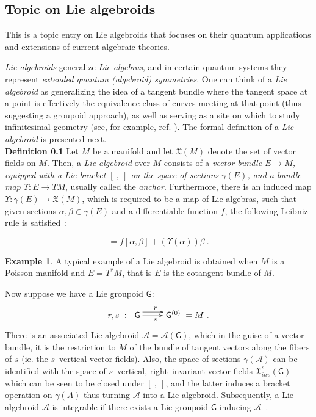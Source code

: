 \documentclass[12pt]{article}
\theoremstyle{plain}
\theoremstyle{definition}
\newtheorem{example}{Example}[section]
\numberwithin{equation}{section}
\newcommand{\A}{\mathcal A}
\renewcommand{\a}{\alpha}
\newcommand{\lra}{{\longrightarrow}}
\newcommand{\<}{{\langle}}
\begin{document}
\subsection{Topic on Lie algebroids}
 This is a topic entry on Lie algebroids that focuses on their quantum applications and extensions of current algebraic theories. 

\emph{Lie algebroids} generalize \emph{Lie algebras}, and in certain quantum systems they represent \emph{extended quantum (algebroid) symmetries}. One can think of a \emph{Lie algebroid} as generalizing the idea of a tangent bundle where the tangent space at a point is effectively the equivalence class of curves meeting at that point (thus
suggesting a groupoid approach), as well as serving as a site on which to study infinitesimal geometry (see, for example, ref. \cite{Mackenzie2005}). The formal definition of a \emph{Lie algebroid} is presented next. \\

\textbf{Definition 0.1}
Let $M$ be a manifold and let $\mathfrak X(M)$ denote the set of vector fields on $M$. Then, a 
\emph{Lie algebroid} over $M$ consists of a \emph{vector bundle $E \lra M$,
equipped with a Lie bracket $[~,~]$ on the space of sections $\gamma(E)$, 
and a bundle map $\Upsilon : E \lra TM$}, usually called the \emph{anchor}. 
Furthermore, there is an induced map $\Upsilon : \gamma (E) \lra \mathfrak X(M)$, 
which is required to be a map of Lie algebras, such that given sections $\a, \beta \in
\gamma(E)$ and a differentiable function $f$, the following
Leibniz rule is satisfied~:

\begin{equation}
[ \a, f \beta] = f [\a, \beta] + (\Upsilon (\a)) \beta~.
\end{equation}


\begin{example}  
A typical example of a Lie algebroid is obtained when $M$ is a Poisson
manifold and $E=T^*M$, that is $E$ is the cotangent bundle of $M$.
\end{example}

Now suppose we have a Lie groupoid $\mathsf{G}$:
\begin{equation}
r,s~:~ \xymatrix{ \mathsf{G} \ar@<1ex>[r]^r \ar[r]_s & \mathsf{G}^{(0)}}=M~.
\end{equation}
There is an associated Lie algebroid $\A = \A( \mathsf{G})$, which in the
guise of a vector bundle, it is the restriction to $M$ of the
bundle of tangent vectors along the fibers of $s$ (ie. the
$s$--vertical vector fields). Also, the space of sections $\gamma
(\A)$ can be identified with the space of $s$--vertical,
right--invariant vector fields $\mathfrak X^s_{inv} (\mathsf{G})$ which
can be seen to be closed under $[~,~]$, and the latter induces a
bracket operation on $\gamma (A)$ thus turning $\A$ into a Lie
algebroid. Subsequently, a Lie algebroid $\A$ is integrable if
there exists a Lie groupoid $\mathsf{G}$ inducing $\A$~.
\end{document}
